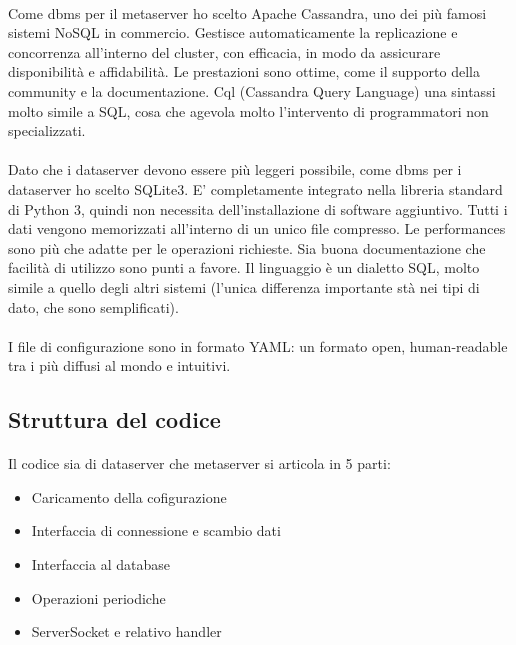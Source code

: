 \documentclass{article}
\begin{document}
\paragraph{} Come dbms per il metaserver ho scelto Apache Cassandra, uno dei più famosi sistemi NoSQL in commercio. Gestisce automaticamente la replicazione e concorrenza all'interno del cluster, con efficacia, in modo da assicurare disponibilità e affidabilità. Le prestazioni sono ottime, come il supporto della community e la documentazione. Cql (Cassandra Query Language) una sintassi molto simile a SQL, cosa che agevola molto l'intervento di programmatori non specializzati.  

\paragraph{} Dato che i dataserver devono essere più leggeri possibile, come dbms per i dataserver ho scelto SQLite3. E' completamente integrato nella libreria standard di Python 3, quindi non necessita dell'installazione di software aggiuntivo. Tutti i dati vengono memorizzati all'interno di un unico file compresso. Le performances sono più che adatte per le operazioni richieste. Sia buona documentazione che facilità di utilizzo sono punti a favore. Il linguaggio è un dialetto SQL, molto simile a quello degli altri sistemi (l'unica differenza importante stà nei tipi di dato, che sono semplificati).  

\paragraph{} I file di configurazione sono in formato YAML: un formato open, human-readable tra i più diffusi al mondo e intuitivi. 


\subsection{Struttura del codice}

\paragraph{} Il codice sia di dataserver che metaserver si articola in 5 parti:\begin{itemize}
	\item Caricamento della cofigurazione
	\item Interfaccia di connessione e scambio dati
	\item Interfaccia al database
	\item Operazioni periodiche
	\item ServerSocket e relativo handler
\end{itemize}
\end{document}
